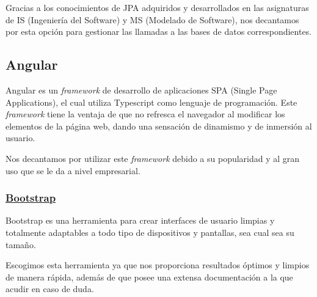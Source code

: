         Gracias a los conocimientos de JPA adquiridos y desarrollados en las asignaturas de IS (Ingeniería del Software) y MS (Modelado de Software), nos decantamos por esta opción para gestionar las llamadas a las bases de datos correspondientes.
        

     \subsection{Angular}
       Angular\cite{angular} es un \textit{framework} de desarrollo de aplicaciones SPA (Single Page Applications), el cual utiliza Typescript como lenguaje de programación. Este \textit{framework} tiene la ventaja de que no refresca el navegador al modificar los elementos de la página web, dando una sensación de dinamismo y de inmersión al usuario.
       \newline
       
       Nos decantamos por utilizar este \textit{framework} debido a su popularidad y al gran uso que se le da a nivel empresarial.

        \subsubsection{\underline{Bootstrap}}
         Bootstrap\cite{bootstrap} es una herramienta para crear interfaces de usuario limpias y totalmente adaptables a todo tipo de dispositivos y pantallas, sea cual sea su tamaño.
         \newline
         
         Escogimos esta herramienta ya que nos proporciona resultados óptimos y limpios de manera rápida, además de que posee una extensa documentación\cite{documentationboostrap} a la que acudir en caso de duda.

   
     